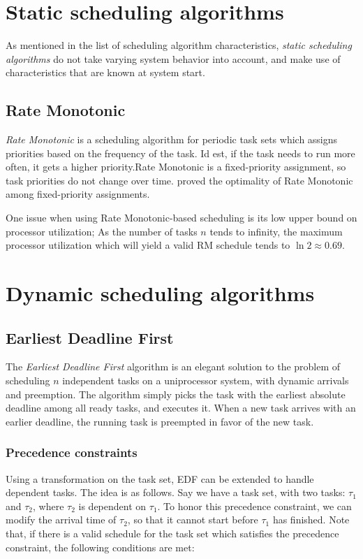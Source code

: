 \documentclass[twoside]{uva-inf-bachelor-thesis}
\newcommand{\task}[1]{\ensuremath{\tau_#1}}
\begin{document}
\section{Static scheduling algorithms}
As mentioned in the list of scheduling algorithm characteristics, \emph{static scheduling algorithms} do not take varying system behavior into account, and make use of characteristics that are known at system start. 

\subsection{Rate Monotonic}
\emph{Rate Monotonic} is a scheduling algorithm for periodic task sets which assigns priorities based on the frequency of the task. Id est, if the task needs to run more often, it gets a higher priority.Rate Monotonic is a fixed-priority assignment, so task priorities do not change over time. \textcite{Liu1973} proved the optimality of Rate Monotonic among fixed-priority assignments.

One issue when using Rate Monotonic-based scheduling is its low upper bound on processor utilization; As the number of tasks $n$ tends to infinity, the maximum processor utilization which will yield a valid RM schedule tends to $\ln 2 \approx 0.69$.

\section{Dynamic scheduling algorithms}

\subsection{Earliest Deadline First}
The \emph{Earliest Deadline First} algorithm is an elegant solution to the problem of scheduling $n$ independent tasks on a uniprocessor system, with dynamic arrivals and preemption. The algorithm simply picks the task with the earliest absolute deadline among all ready tasks, and executes it. When a new task arrives with an earlier deadline, the running task is preempted in favor of the new task.

\subsubsection{Precedence constraints}
Using a transformation on the task set, EDF can be extended to handle dependent tasks\cite{Chetto1990}. The idea is as follows. Say we have a task set, with two tasks: \task{1} and \task{2}, where \task{2} is dependent on \task{1}. To honor this precedence constraint, we can modify the arrival time of \task{2}, so that it cannot start before \task{1} has finished. Note that, if there is a valid schedule for the task set which satisfies the precedence constraint, the following conditions are met:
\end{document}
